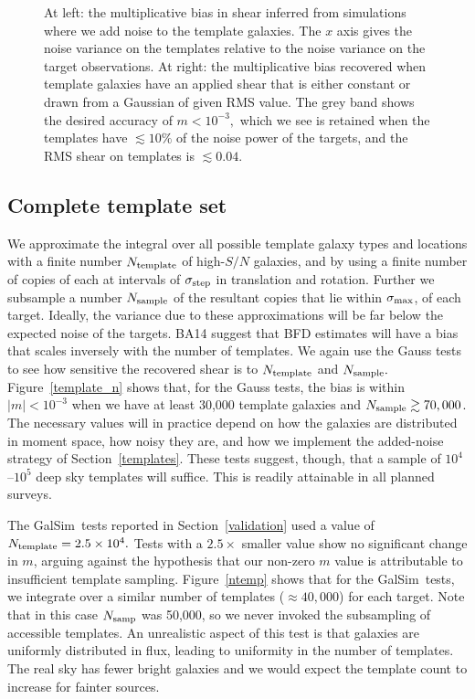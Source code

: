 \documentclass[11pt,preprint,flushrt]{aastex}
\newcommand{\galsim}{{\sc GalSim}}
\newcommand\edit[1]{#1}
\begin{document}
\begin{figure}[ht]
\caption[]{At left: the multiplicative bias in shear inferred from
  simulations where  we add noise to the template
galaxies.  The $x$ axis gives the noise variance on the templates
relative to the noise variance on the target observations.  At right:
the multiplicative bias recovered when template galaxies
  have an applied shear that is either constant or drawn from a
  Gaussian of given RMS value.  The grey band shows the 
desired accuracy of $m<10^{-3},$ which we see is retained when the
templates have $\lesssim10\%$ of the noise power of the targets, and
the RMS shear on templates is $\lesssim0.04.$}
\label{template_noise}
\end{figure}

\subsection{Complete template set}
\label{samplesec}
We approximate the integral over all possible template galaxy types
and locations with a finite number $N_{\rm template}$ of high-$S/N$
galaxies, and by using a finite number of copies of each at 
intervals of $\sigma_{\rm step}$ in translation and rotation.  Further
we subsample a number $N_{\rm sample}$ of the resultant copies that
lie within $\sigma_{\rm max}$, of each target.
Ideally, the variance due to these approximations will be far below 
the expected noise of the targets. BA14 suggest that BFD estimates
will have a bias that scales inversely with the number of templates. 
We again use the Gauss tests to 
see how sensitive the recovered shear is to $N_{\rm template}$ and
$N_{\rm sample}.$ 
Figure~\ref{template_n} shows that, for the Gauss tests, the bias is within
$|m|<10^{-3}$ 
when we have at least 30,000 template galaxies and $N_{\rm sample}
\gtrsim 70,000$. The necessary values will in practice depend on how
the galaxies are distributed in moment space, how noisy they are, and
how we implement the added-noise strategy of Section~\ref{templates}.
These tests suggest, though, that a sample of $10^4$--$10^5$ deep sky
templates will suffice.  This is readily attainable in all planned surveys.

\edit{The \galsim\ tests reported in Section~\ref{validation} used a value
of $N_{\rm template}=2.5\times10^4.$ Tests with a $2.5\times$ smaller value show no
significant change in $m$, arguing against the hypothesis that our
non-zero $m$ value is attributable to insufficient template
sampling. Figure~\ref{ntemp} shows that for the \galsim\ tests, we
integrate over a similar number of templates ($\approx 40,000$) for
each target.  Note that in this case $N_{\rm samp}$ was 50,000, so we
never invoked the subsampling of accessible templates.  An unrealistic
aspect of this test is that galaxies are uniformly distributed
in flux, leading to uniformity in the number of templates.  The real
sky has fewer bright galaxies and we would expect the template count
to increase for fainter sources.
}
\end{document}

